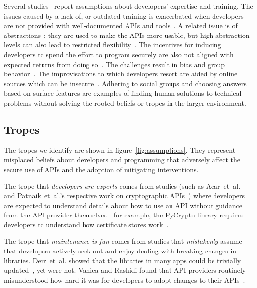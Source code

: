 \documentclass[conference]{IEEEtran}
\newcommand{\etal}[0]{et~al{.}}
\begin{document}
Several studies~\cite{zhu2014,tyler2015,whitney2015,lipford2016} report assumptions about developers' expertise and training. The issues caused by a lack of, or outdated training is exacerbated when developers are not provided with well-documented APIs and tools~\cite{Oliveira2018soups,acarusability2017,smith2020why}. A related issue is of abstractions~\cite{anderson2013,ranenberg2020}: they are used to make the APIs more usable,  but high-abstraction levels can also lead to restricted flexibility~\cite{loiacono2017ido}. The incentives for inducing developers to spend the effort to program securely are also not aligned with expected returns from doing so~\cite{erikacar2017,naiakshina2018}. The challenges result in bias and group behavior~\cite{emmasurface2020,acar2016infosources}. The improvisations to which developers resort are aided by online sources which can be insecure~\cite{fahl2012,linden2020,acar2016infosources}. Adhering to social groups and choosing answers based on surface features are examples of finding human solutions to technical problems without solving the rooted beliefs or tropes in the larger environment. 

\subsection {Tropes}

The tropes we identify are shown in figure~\ref{fig:assumptions}.  They represent misplaced beliefs about developers and programming that adversely affect the secure use of APIs and the adoption of mitigating interventions.

The trope that \emph{developers are experts} comes from studies (such as Acar~\etal{} and Patnaik~\etal{}'s respective work on cryptographic APIs~\cite{acarusability2017,patnaik2019}) where developers are expected to understand details about how to use an API without guidance from the API provider themselves---for example, the PyCrypto library requires developers to understand how certificate stores work~\cite{acarusability2017}.  

The trope that \emph{maintenance is fun} comes from studies that \emph{mistakenly} assume that developers actively seek out and enjoy dealing with breaking changes in libraries.  Derr~\etal{} showed that the libraries in many apps could be trivially updated~\cite{erikacar2017}, yet were not.  Vaniea and Rashidi found that API providers routinely misunderstood how hard it was for developers to adopt changes to their APIs~\cite{vaniea2016}.  
\end{document}
